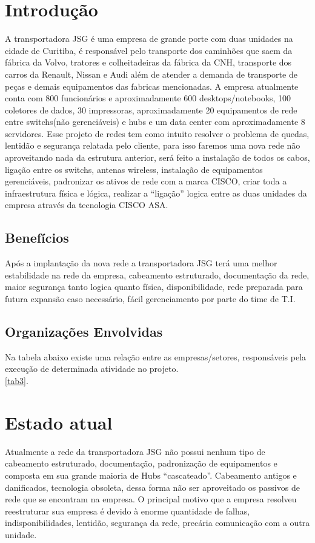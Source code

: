\documentclass[	DIV=calc,%
							paper=a4,%
							fontsize=12pt,%
							onecolumn]{scrartcl}	 					%
\begin{document}
\section{Introdução}
	A transportadora JSG é uma empresa de grande porte com duas unidades na cidade de Curitiba, é responsável pelo transporte dos caminhões que saem da fábrica da Volvo, tratores e colheitadeiras da fábrica da CNH, transporte dos carros da Renault, Nissan e Audi além de atender a demanda de transporte de peças e demais equipamentos das fabricas mencionadas. 
	A empresa atualmente conta com 800 funcionários e aproximadamente 600 desktops/notebooks, 100 coletores de dados, 30 impressoras, aproximadamente 20 equipamentos de rede entre switchs(não gerenciáveis) e hubs e um data center com aproximadamente 8 servidores.
	Esse projeto de redes tem como intuito resolver o problema de quedas, lentidão e segurança relatada pelo cliente, para isso faremos uma nova rede não aproveitando nada da estrutura anterior, será feito a instalação de todos os cabos, ligação entre os switchs, antenas wireless, instalação de equipamentos gerenciáveis, padronizar os ativos de rede com a marca CISCO, criar toda a infraestrutura física e lógica, realizar a “ligação” logica entre as duas unidades da empresa através da tecnologia CISCO ASA.

\subsection{Benefícios}
Após a implantação da nova rede a transportadora JSG terá uma melhor estabilidade na rede da empresa, cabeamento estruturado, documentação da rede, maior segurança tanto logica quanto física, disponibilidade, rede preparada para futura expansão caso necessário, fácil gerenciamento por parte do time de T.I.

\subsection{Organizações Envolvidas}
Na tabela abaixo existe uma relação entre as empresas/setores, responsáveis pela execução de determinada atividade no projeto.\\
 \ref{tab3}.


\section{Estado atual}
	Atualmente a rede da transportadora JSG não possui nenhum tipo de cabeamento estruturado, documentação, padronização de equipamentos e composta em sua grande maioria de Hubs “cascateado”.  
	Cabeamento antigos e danificados, tecnologia obsoleta, dessa forma não ser aproveitado os passivos de rede que se encontram na empresa.
	O principal motivo que a empresa resolveu reestruturar sua empresa é devido à enorme quantidade de falhas, indisponibilidades, lentidão, segurança da rede, precária comunicação com a outra unidade.
\end{document}
